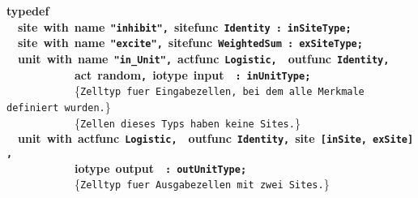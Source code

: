 {\bf typedef}\\
~~{\bf site}~{\bf with}~{\bf name}~{\bf \verb&"inhibit"&}{\bf \verb&,&}~{\bf sitefunc}~{\bf \verb&Identity&}~{\bf \verb&:&}~{\bf \verb&inSiteType&}{\bf \verb&;&}\\
~~{\bf site}~{\bf with}~{\bf name}~{\bf \verb&"excite"&}{\bf \verb&,&}~{\bf sitefunc}~{\bf \verb&WeightedSum&}~{\bf \verb&:&}~{\bf \verb&exSiteType&}{\bf \verb&;&}\\[.3cm]
~~{\bf unit}~{\bf with}~{\bf name}~{\bf \verb&"in_Unit"&}{\bf \verb&,&}~{\bf actfunc}~{\bf \verb&Logistic&}{\bf \verb&,&}~~{\bf outfunc}~{\bf \verb&Identity&}{\bf \verb&,&}~\\
~~~~~~~~~~~~{\bf act}~{\bf random}{\bf \verb&,&}~{\bf iotype}~{\bf input}~~{\bf \verb&:&}~{\bf \verb&inUnitType&}{\bf \verb&;&}\\
~~~~~~~~~~~~{\small \{\verb{Zelltyp fuer Eingabezellen, bei dem alle Merkmale definiert wurden.{\}}\\
~~~~~~~~~~~~{\small \{\verb{Zellen dieses Typs haben keine Sites.{\}}\\[.3cm]
~~{\bf unit}~{\bf with}~{\bf actfunc}~{\bf \verb&Logistic&}{\bf \verb&,&}~~{\bf outfunc}~{\bf \verb&Identity&}{\bf \verb&,&}~{\bf site}~{\bf \verb&[&}{\bf \verb&inSite&}{\bf \verb&,&}~{\bf \verb&exSite&}{\bf \verb&]&}{\bf \verb&,&}\\
~~~~~~~~~~~~{\bf iotype}~{\bf output}~~{\bf \verb&:&}~{\bf \verb&outUnitType&}{\bf \verb&;&}\\
~~~~~~~~~~~~{\small \{\verb{Zelltyp fuer Ausgabezellen mit zwei Sites.{\}}\\
